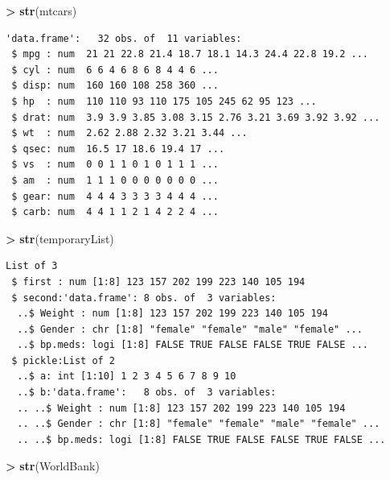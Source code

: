 \documentclass[]{krantz}
\makeatletter
\newenvironment{Shaded}{\begin{snugshade}}{\end{snugshade}}
\newcommand{\KeywordTok}[1]{\textcolor[rgb]{0.27,0.27,0.27}{\textbf{#1}}}
\newcommand{\StringTok}[1]{\textcolor[rgb]{0.5,0.5,0.5}{#1}}
\newcommand{\OperatorTok}[1]{\textcolor[rgb]{0.43,0.43,0.43}{\textbf{#1}}}
\newcommand{\NormalTok}[1]{#1}
\newenvironment{kframe}{%
\medskip{}
\setlength{\fboxsep}{.8em}
 \def\at@end@of@kframe{}%
 \ifinner\ifhmode%
  \def\at@end@of@kframe{\end{minipage}}%
  \begin{minipage}{\columnwidth}%
 \fi\fi%
 \def\FrameCommand##1{\hskip\@totalleftmargin \hskip-\fboxsep
 \colorbox{shadecolor}{##1}\hskip-\fboxsep
     \hskip-\linewidth \hskip-\@totalleftmargin \hskip\columnwidth}%
 \MakeFramed {\advance\hsize-\width
   \@totalleftmargin\z@ \linewidth\hsize
   \@setminipage}}%
 {\par\unskip\endMakeFramed%
 \at@end@of@kframe}
\renewenvironment{Shaded}{\begin{kframe}}{\end{kframe}}
\makeatother
\begin{document}
\begin{Shaded}
\begin{Highlighting}[]
\OperatorTok{>}\StringTok{ }\KeywordTok{str}\NormalTok{(mtcars)}
\end{Highlighting}
\end{Shaded}

\begin{verbatim}
'data.frame':   32 obs. of  11 variables:
 $ mpg : num  21 21 22.8 21.4 18.7 18.1 14.3 24.4 22.8 19.2 ...
 $ cyl : num  6 6 4 6 8 6 8 4 4 6 ...
 $ disp: num  160 160 108 258 360 ...
 $ hp  : num  110 110 93 110 175 105 245 62 95 123 ...
 $ drat: num  3.9 3.9 3.85 3.08 3.15 2.76 3.21 3.69 3.92 3.92 ...
 $ wt  : num  2.62 2.88 2.32 3.21 3.44 ...
 $ qsec: num  16.5 17 18.6 19.4 17 ...
 $ vs  : num  0 0 1 1 0 1 0 1 1 1 ...
 $ am  : num  1 1 1 0 0 0 0 0 0 0 ...
 $ gear: num  4 4 4 3 3 3 3 4 4 4 ...
 $ carb: num  4 4 1 1 2 1 4 2 2 4 ...
\end{verbatim}

\begin{Shaded}
\begin{Highlighting}[]
\OperatorTok{>}\StringTok{ }\KeywordTok{str}\NormalTok{(temporaryList)}
\end{Highlighting}
\end{Shaded}

\begin{verbatim}
List of 3
 $ first : num [1:8] 123 157 202 199 223 140 105 194
 $ second:'data.frame': 8 obs. of  3 variables:
  ..$ Weight : num [1:8] 123 157 202 199 223 140 105 194
  ..$ Gender : chr [1:8] "female" "female" "male" "female" ...
  ..$ bp.meds: logi [1:8] FALSE TRUE FALSE FALSE TRUE FALSE ...
 $ pickle:List of 2
  ..$ a: int [1:10] 1 2 3 4 5 6 7 8 9 10
  ..$ b:'data.frame':   8 obs. of  3 variables:
  .. ..$ Weight : num [1:8] 123 157 202 199 223 140 105 194
  .. ..$ Gender : chr [1:8] "female" "female" "male" "female" ...
  .. ..$ bp.meds: logi [1:8] FALSE TRUE FALSE FALSE TRUE FALSE ...
\end{verbatim}

\begin{Shaded}
\begin{Highlighting}[]
\OperatorTok{>}\StringTok{ }\KeywordTok{str}\NormalTok{(WorldBank)}
\end{Highlighting}
\end{Shaded}
\end{document}
